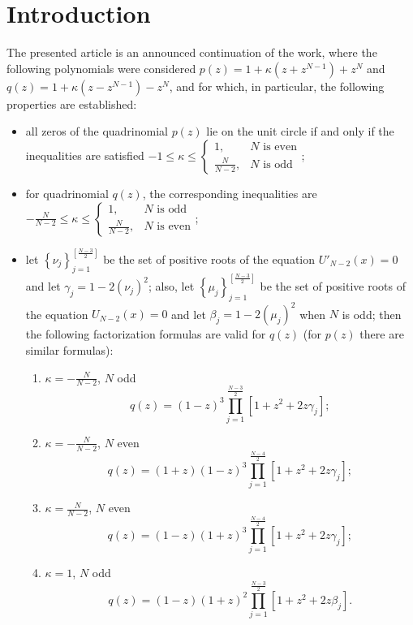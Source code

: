 \documentclass[12pt]{article}
\newcommand{\br}[1]{\left[#1\right]}
\newcommand{\cb}[1]{\left\{#1\right\}}
\begin{document}
\section{Introduction}
The presented article is an announced continuation of the work\cite{ref1}, where the following polynomials were considered
$p(z) = 1 + \kappa(z + z^{N-1}) + z^N$ and $q(z) = 1 + \kappa(z - z^{N - 1}) - z^N$,
and for which, in particular, the following properties are established:
\begin{itemize}
\item all zeros of the quadrinomial $p(z)$ lie on the unit circle if and only if the inequalities are satisfied
$-1 \leq \kappa \leq \begin{cases}
1, & N \mbox{ is even} \\
\frac{N}{N -2}, & N \mbox{ is odd}
\end{cases}$;
\item for quadrinomial $q(z)$, the corresponding inequalities are
$-\frac{N}{N-2} \leq \kappa \leq \begin{cases}
1, & N \mbox{ is odd} \\
\frac{N}{N -2}, & N \mbox{ is even}
\end{cases}$;
\item let
$\cb{\nu_j}_{j = 1}^{\br{\frac{N - 3}{2}}}$ be the set of positive roots of the equation
$U'_{N - 2}(x) = 0$ and let $\gamma_j = 1 - 2(\nu_j)^2$;
also, let $\cb{\mu_j}_{j = 1}^{\br{\frac{N - 3}{2}}}$ be the set of positive roots of the equation $U_{N - 2}(x) = 0$ and let $\beta_j = 1 - 2(\mu_j)^2$ when $N$ is odd; then the following factorization formulas are valid for $q(z)$ (for $p(z)$ there are similar formulas):
\begin{enumerate}[\label=i)]
\item $\kappa = -\frac{N}{N - 2}$, $N$ odd
\begin{displaymath}
q(z) = (1 - z)^3\prod_{j = 1}^{\frac{N - 3}{2}}\br{1 + z^2 + 2z\gamma_j};
\end{displaymath}
\item $\kappa = -\frac{N}{N - 2}$, $N$ even
\begin{displaymath}
q(z) = (1 + z)(1 - z)^3\prod_{j = 1}^{\frac{N - 4}{2}}\br{1 + z^2 + 2z\gamma_j};
\end{displaymath}
\item $\kappa = \frac{N}{N - 2}$, $N$ even
\begin{displaymath}
q(z) = (1 - z)(1 + z)^3\prod_{j = 1}^{\frac{N - 4}{2}}\br{1 + z^2 + 2z\gamma_j};
\end{displaymath}
\item $\kappa = 1$, $N$ odd
\begin{displaymath}
q(z) = (1 - z)(1 + z)^2\prod_{j = 1}^{\frac{N - 3}{2}}\br{1 + z^2 + 2z\beta_j}.
\end{displaymath}
\end{enumerate}
\end{itemize}
\end{document}
